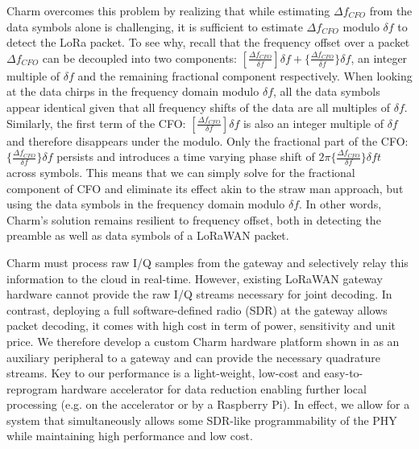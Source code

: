 Charm overcomes this problem by realizing that while estimating $\Delta
f_{CFO}$ from the data symbols alone is challenging, it is sufficient to
estimate $\Delta f_{CFO}$ modulo $\delta f$ to detect the LoRa packet. To see
why, recall that the frequency offset over a packet $\Delta f_{CFO}$ can be
decoupled into two components: $[\frac{\Delta f_{CFO}}{\delta f}]\delta f + \{\frac{\Delta f_{CFO}}{\delta f}\}\delta f$, an
integer multiple of $\delta f$ and the remaining fractional component
respectively. When looking at the data chirps in the frequency domain modulo
$\delta f$, all the data symbols appear identical given that all frequency
shifts of the data are all multiples of $\delta f$. Similarly, the first term of the CFO:
$[\frac{\Delta f_{CFO}}{\delta f}]\delta f$ is also an integer multiple of $\delta f$ and therefore disappears under the modulo. Only the fractional part of the CFO: $\{\frac{\Delta f_{CFO}}{\delta f}\}\delta f$ persists
and introduces a time varying phase shift of $2 \pi \{\frac{\Delta f_{CFO}}{\delta f}\}\delta f t$
across symbols. This means that we can simply solve for the fractional component of CFO and eliminate its effect akin to the straw man approach, but using the data
symbols in the frequency domain modulo $\delta f$. In other words, Charm's
solution remains resilient to frequency offset, both in detecting the preamble
as well as data symbols of a LoRaWAN packet.

Charm must process raw I/Q samples from the gateway and selectively relay this
information to the cloud in real-time. However, existing LoRaWAN gateway
hardware cannot provide the raw I/Q streams necessary for joint decoding. In
contrast, deploying a full software-defined radio (SDR) at the gateway allows
packet decoding, it comes with high cost in term of power, sensitivity and
unit price. We therefore develop a custom Charm hardware platform shown in
 as an auxiliary peripheral to a gateway and can
provide the necessary quadrature streams. Key to our performance is a
light-weight, low-cost and easy-to-reprogram hardware accelerator for data
reduction enabling further local processing (e.g. on the accelerator or by a
Raspberry Pi). In effect, we allow for a system that simultaneously allows
some SDR-like programmability of the PHY while maintaining high performance
and low cost.

